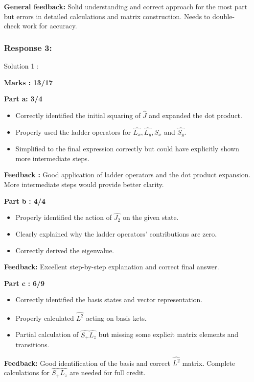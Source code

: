 \documentclass[a4paper,11pt]{article}
\begin{document}
\textbf{General feedback:}
Solid understanding and correct approach for the most part but errors in detailed calculations and matrix construction. Needs to double-check work for accuracy.




\subsubsection*{Response 3:}

Solution 1 :

\textbf{Marks : 13/17}

\textbf{Part a: 3/4}
\begin{itemize}
    \item Correctly identified the initial squaring of $\hat{J}$ and expanded the dot product.
    \item Properly used the ladder operators for $\hat{L_x}, \hat{L_y}, \hat{S_x}$ and $\hat{S_y}$.
    \item Simplified to the final expression correctly but could have explicitly shown more intermediate steps.
\end{itemize}

\textbf{Feedback :}
Good application of ladder operators and the dot product expansion. More intermediate steps would provide better clarity.


\textbf{Part b : 4/4}
\begin{itemize}
    \item Properly identified the action of $\hat{J_2}$ on the given state.
    \item Clearly explained why the ladder operators' contributions are zero.
    \item Correctly derived the eigenvalue.
\end{itemize}

\textbf{Feedback:}
Excellent step-by-step explanation and correct final answer.


\textbf{Part c : 6/9}
\begin{itemize}
    \item Correctly identified the basis states and vector representation.
    \item Properly calculated $\hat{L^2}$ acting on basis kets.
    \item Partial calculation of $\hat{S_+}\hat{L_z}$ but missing some explicit matrix elements and transitions.
\end{itemize}

\textbf{Feedback:}
Good identification of the basis and correct $\hat{L^2}$ matrix. Complete calculations for $\hat{S_+}\hat{L_z}$ are needed for full credit.
\end{document}
